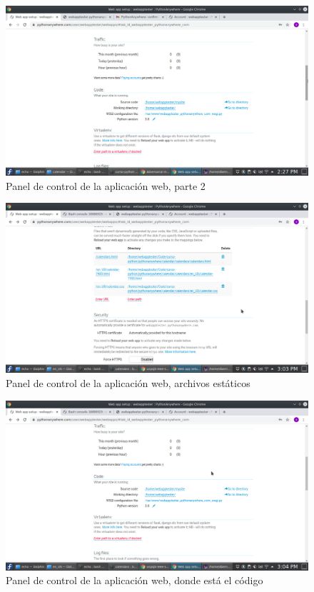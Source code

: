 \documentclass[10pt,a4paper]{article}
\begin{document}
\begin{figure}
	\centering
	\includegraphics[width=0.7\linewidth]{sc/webapp_part_2}
	\caption{Panel de control de la aplicación web, parte 2}
	\label{fig:webapppart2}
\end{figure}

\begin{figure}
	\centering
	\includegraphics[width=0.7\linewidth]{sc/webapp_static_0}
	\caption{Panel de control de la aplicación web, archivos estáticos}
	\label{fig:webappstatic0}
\end{figure}

\begin{figure}
	\centering
	\includegraphics[width=0.7\linewidth]{sc/webapp_code}
	\caption{Panel de control de la aplicación web, donde está el código}
	\label{fig:webappcode}
\end{figure}
\end{document}
